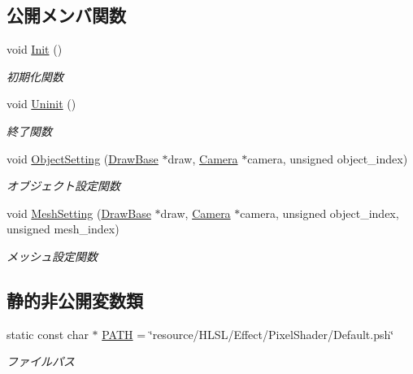 \subsection*{公開メンバ関数}
\begin{DoxyCompactItemize}
\item 
void \mbox{\hyperlink{class_pixel_shader_default_a74187e4e936d79947753bf4028a411bf}{Init}} ()
\begin{DoxyCompactList}\small\item\em 初期化関数 \end{DoxyCompactList}\item 
void \mbox{\hyperlink{class_pixel_shader_default_af195bc2ba2e5f7352d4b762b20825d95}{Uninit}} ()
\begin{DoxyCompactList}\small\item\em 終了関数 \end{DoxyCompactList}\item 
void \mbox{\hyperlink{class_pixel_shader_default_ae70580bd12afdbf654122bdb4dce85d0}{Object\+Setting}} (\mbox{\hyperlink{class_draw_base}{Draw\+Base}} $\ast$draw, \mbox{\hyperlink{class_camera}{Camera}} $\ast$camera, unsigned object\+\_\+index)
\begin{DoxyCompactList}\small\item\em オブジェクト設定関数 \end{DoxyCompactList}\item 
void \mbox{\hyperlink{class_pixel_shader_default_a18985aa792820858e214f141643119c4}{Mesh\+Setting}} (\mbox{\hyperlink{class_draw_base}{Draw\+Base}} $\ast$draw, \mbox{\hyperlink{class_camera}{Camera}} $\ast$camera, unsigned object\+\_\+index, unsigned mesh\+\_\+index)
\begin{DoxyCompactList}\small\item\em メッシュ設定関数 \end{DoxyCompactList}\end{DoxyCompactItemize}
\subsection*{静的非公開変数類}
\begin{DoxyCompactItemize}
\item 
static const char $\ast$ \mbox{\hyperlink{class_pixel_shader_default_a45201e7b3035e053d0171222c324f91e}{P\+A\+TH}} = \char`\"{}resource/H\+L\+SL/Effect/Pixel\+Shader/Default.\+psh\char`\"{}
\begin{DoxyCompactList}\small\item\em ファイルパス \end{DoxyCompactList}\end{DoxyCompactItemize}
